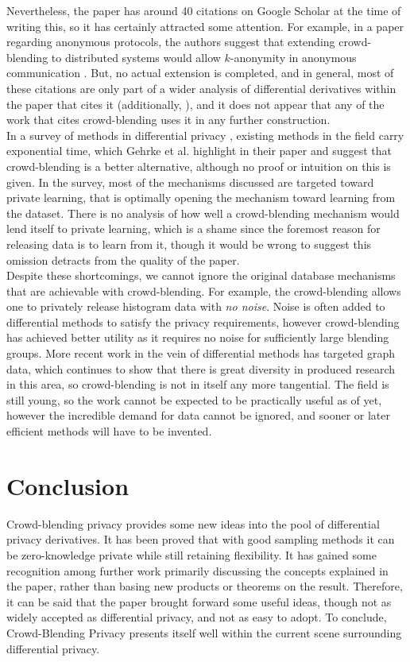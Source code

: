 \documentclass[12pt]{article}
\begin{document}
Nevertheless, the paper has around 40 citations on Google Scholar
at the time of writing this, so it has certainly attracted some
attention. For example, in a paper regarding anonymous
protocols, the authors suggest that extending crowd-blending
to distributed systems would allow $k$-anonymity in anonymous communication
\cite{backes2013anoa}. But, no actual extension is
completed, and in general, most of these citations are only
part of a wider analysis of differential derivatives within
the paper that cites it (additionally, \cite{coupled}), and
it does not appear that any of the work that cites
crowd-blending uses it in any further construction. \\

In a survey of methods in differential privacy \cite{Dwork2008}, existing
 methods in the field carry exponential time, which Gehrke et al. highlight
 in their paper and suggest that crowd-blending is a better alternative, although
 no proof or intuition on this is given. In the survey, most of the
 mechanisms discussed are targeted toward private learning, that is
 optimally opening the mechanism toward learning from the dataset. There
 is no analysis of how well a crowd-blending mechanism would lend
 itself to private learning, which is a shame since the foremost
 reason for releasing data is to learn from it, though it would be
 wrong to suggest this omission detracts from the quality of the paper.
\\

Despite these shortcomings, we cannot ignore the original database
mechanisms that are achievable with crowd-blending. For example,
the crowd-blending allows one to privately release histogram data
with \textit{no noise}. Noise is often added to differential
methods to satisfy the privacy requirements, however crowd-blending
has achieved better utility as it requires no noise for sufficiently
large blending groups. More recent work in the
vein of differential methods has targeted graph data\cite{WISA:NNKK15},
which continues to show that there is great diversity in produced
research in this area, so crowd-blending is not in itself
any more tangential. The field is still young, so the work
cannot be expected to be practically useful as of yet, however the
incredible demand for data cannot be ignored, and sooner or later
efficient methods will have to be invented.


\newpage
\section{Conclusion}
Crowd-blending privacy provides some new ideas into the pool
of differential privacy derivatives. It has been proved that
with good sampling methods it can be zero-knowledge private
while still retaining flexibility. It has gained some
recognition among further work primarily discussing the
concepts explained in the paper, rather than basing new
products or theorems on the result. Therefore, it can be said
that the paper brought forward some useful ideas, though not
as widely accepted as differential privacy, and not as easy to adopt.
To conclude, Crowd-Blending Privacy presents itself
well within the current scene surrounding differential privacy.




\end{document}
